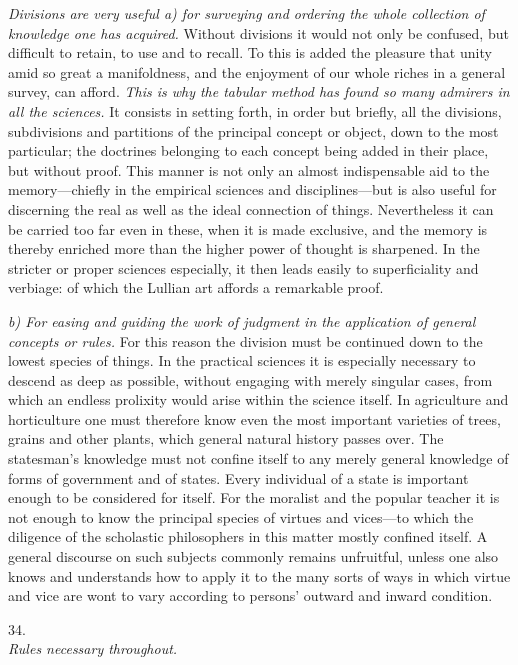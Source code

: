 \documentclass[12pt,a4paper]{article}
\newcommand{\logsec}[2]{%
  \bigskip\begin{center}{\large #1}\\[4pt]{\emph{#2}}\end{center}\smallskip}
\begin{document}
\noindent
\emph{Divisions are very useful a) for surveying and ordering the whole
collection of knowledge one has acquired.} Without divisions it would not only
be confused, but difficult to retain, to use and to recall. To this is added the
pleasure that unity amid so great a manifoldness, and the enjoyment of our whole
riches in a general survey, can afford. \emph{This is why the tabular method has
found so many admirers in all the sciences.} It consists in setting forth, in
order but briefly, all the divisions, subdivisions and partitions of the
principal concept or object, down to the most particular; the doctrines
belonging to each concept being added in their place, but without proof. This
manner is not only an almost indispensable aid to the memory---chiefly in the
empirical sciences and disciplines---but is also useful for discerning the real
as well as the ideal connection of things. Nevertheless it can be carried too
far even in these, when it is made exclusive, and the memory is thereby enriched
more than the higher power of thought is sharpened. In the stricter or proper
sciences especially, it then leads easily to superficiality and verbiage: of
which the Lullian art affords a remarkable proof.

\emph{b) For easing and guiding the work of judgment in the application of
general concepts or rules.} For this reason the division must be continued down
to the lowest species of things. In the practical sciences it is especially
necessary to descend as deep as possible, without engaging with merely singular
cases, from which an endless prolixity would arise within the science itself. In
agriculture and horticulture one must therefore know even the most important
varieties of trees, grains and other plants, which general natural history
passes over. The statesman's knowledge must not confine itself to any merely
general knowledge of forms of government and of states. Every individual of a
state is important enough to be considered for itself. For the moralist and the
popular teacher it is not enough to know the principal species of virtues and
vices---to which the diligence of the scholastic philosophers in this matter
mostly confined itself. A general discourse on such subjects commonly remains
unfruitful, unless one also knows and understands how to apply it to the many
sorts of ways in which virtue and vice are wont to vary according to persons'
outward and inward condition.

\logsec{34.}{Rules necessary throughout.}
\end{document}
